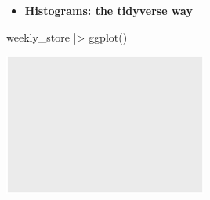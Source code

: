 \documentclass[
  ignorenonframetext,
]{beamer}
\newenvironment{Shaded}{\begin{snugshade}}{\end{snugshade}}
\newcommand{\FunctionTok}[1]{\textcolor[rgb]{0.28,0.35,0.67}{#1}}
\newcommand{\NormalTok}[1]{\textcolor[rgb]{0.00,0.23,0.31}{#1}}
\newcommand{\SpecialCharTok}[1]{\textcolor[rgb]{0.37,0.37,0.37}{#1}}
\providecommand{\tightlist}{%
  \setlength{\itemsep}{0pt}\setlength{\parskip}{0pt}}\usepackage{longtable,booktabs,array}
\begin{document}
\begin{frame}[fragile]{}
\label{section-17}
\begin{itemize}
\tightlist
\item
  \textbf{Histograms: the tidyverse way}
\end{itemize}

\tiny

\begin{Shaded}
\begin{Highlighting}[]
\NormalTok{weekly\_store }\SpecialCharTok{|\textgreater{}} \FunctionTok{ggplot}\NormalTok{()}
\end{Highlighting}
\end{Shaded}

\begin{center}
\includegraphics[width=0.5\textwidth,height=\textheight]{003_describing_data_files/figure-beamer/unnamed-chunk-16-1.pdf}
\end{center}
\end{frame}
\end{document}
